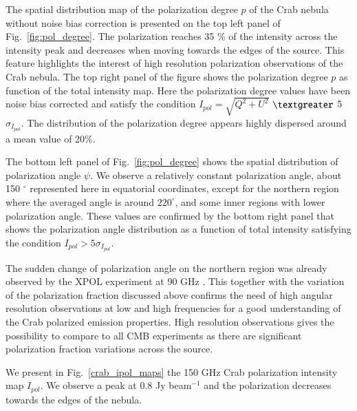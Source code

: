 \documentclass[twocolumn,traditabstract]{aa}
\begin{document}
The spatial distribution map of the polarization degree $p$ of the Crab nebula without
noise bias correction is presented on the top left panel of
Fig.~\ref{fig:pol_degree}. The polarization reaches 35 \% of the intensity
across the intensity peak and decreases when moving towards the edges of the
source.  This feature highlights the interest of high resolution polarization
observations of the Crab nebula. The top right panel of the figure shows the
polarization degree $p$ as function of the total intensity map. Here the
polarization degree values have been noise bias corrected and satisfy the
condition $I_{pol}=\sqrt{Q^2+U^2}$ $\textgreater$ 5 $\sigma_{I_{pol}}$. The
distribution of the polarization degree appears highly dispersed around a mean
value of 20\%.

The bottom left panel of Fig.~\ref{fig:pol_degree} shows the spatial distribution of polarization angle
$\psi$.  We observe a relatively constant polarization
angle, about 150 $^{\circ}$ represented here in equatorial coordinates, except
for the northern region where the averaged angle is around $220^{\circ}$, and
some inner regions with lower polarization angle.  These values are confirmed by
the bottom right panel that shows the polarization angle distribution as a
function of total intensity satisfying the condition $I_{pol} > 5\sigma_{I_{pol}}$.

The sudden change of polarization angle on the northern region was already
observed by the XPOL experiment at 90 GHz \citep{aumont2010}.  This together
with the variation of the polarization fraction discussed above confirms the
need of high angular resolution observations at low and high frequencies for a
good understanding of the Crab polarized emission properties.
High resolution observations gives the possibility to compare to all CMB experiments as there are significant polarization fraction variations across the source.

We present in Fig.~\ref{crab_ipol_maps} the 150 GHz Crab polarization intensity
map $I_{pol}$. We observe a peak at 0.8 Jy beam$^{-1}$ and the polarization
decreases towards the edges of the nebula.

\end{document}
